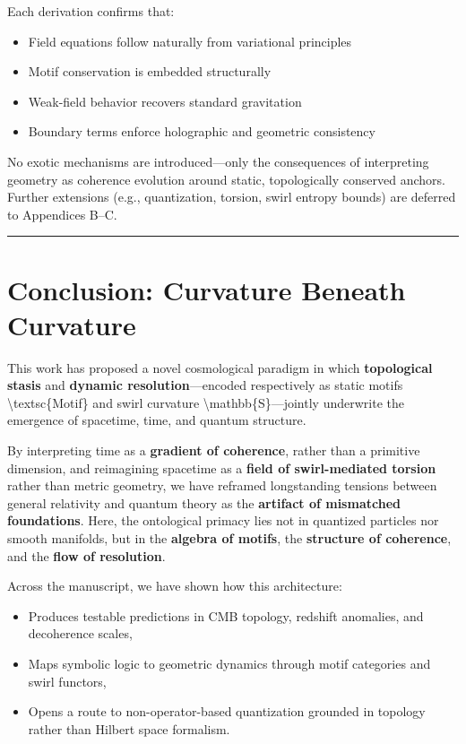 \documentclass[
  11pt,
]{article}
\providecommand{\tightlist}{%
  \setlength{\itemsep}{0pt}\setlength{\parskip}{0pt}}
\begin{document}
Each derivation confirms that:

\begin{itemize}
\tightlist
\item
  Field equations follow naturally from variational principles
\item
  Motif conservation is embedded structurally
\item
  Weak-field behavior recovers standard gravitation
\item
  Boundary terms enforce holographic and geometric consistency
\end{itemize}

No exotic mechanisms are introduced---only the consequences of
interpreting geometry as coherence evolution around static,
topologically conserved anchors. Further extensions (e.g., quantization,
torsion, swirl entropy bounds) are deferred to Appendices B--C.

\begin{center}\rule{0.5\linewidth}{0.5pt}\end{center}

\section{\texorpdfstring{\textbf{Conclusion: Curvature Beneath
Curvature}}{Conclusion: Curvature Beneath Curvature}}\label{conclusion-curvature-beneath-curvature}

This work has proposed a novel cosmological paradigm in which
\textbf{topological stasis} and \textbf{dynamic resolution}---encoded
respectively as static motifs \textbackslash textsc\{Motif\} and swirl
curvature \textbackslash mathbb\{S\}---jointly underwrite the emergence
of spacetime, time, and quantum structure.

By interpreting time as a \textbf{gradient of coherence}, rather than a
primitive dimension, and reimagining spacetime as a \textbf{field of
swirl-mediated torsion} rather than metric geometry, we have reframed
longstanding tensions between general relativity and quantum theory as
the \textbf{artifact of mismatched foundations}. Here, the ontological
primacy lies not in quantized particles nor smooth manifolds, but in the
\textbf{algebra of motifs}, the \textbf{structure of coherence}, and the
\textbf{flow of resolution}.

Across the manuscript, we have shown how this architecture:

\begin{itemize}
\tightlist
\item
  Produces testable predictions in CMB topology, redshift anomalies, and
  decoherence scales,
\item
  Maps symbolic logic to geometric dynamics through motif categories and
  swirl functors,
\item
  Opens a route to non-operator-based quantization grounded in topology
  rather than Hilbert space formalism.
\end{itemize}
\end{document}
